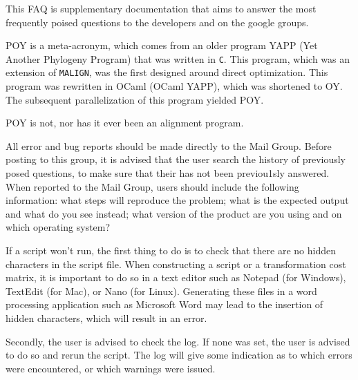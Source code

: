 This FAQ is supplementary documentation that aims to answer the most frequently poised questions to 
the \poy developers and on the \poy google groups.

\renewcommand{\cftdotsep}{\cftnodots} %
\listofquestions
\newpage


{POY is a meta-acronym, which comes from an older program YAPP (Yet Another Phylogeny Program) that
was written in \texttt{C}.  This program, which was an extension of \texttt{MALIGN}, was the first designed around direct
optimization.  This program was rewritten in OCaml (OCaml YAPP), which was shortened to OY.
The subsequent parallelization of this program yielded POY.}

{POY is not, nor has it ever been an alignment program.}

{All error and bug reports should be made directly to the \poy Mail Group. Before posting to this group, it is advised that the 
user search the history of previously posed questions, to make sure that their has not been previou1sly answered.
When reported to the Mail Group, users should include the following information: what steps will 
reproduce the problem; what is the expected output and what do you see instead;  what version of 
the product are you using and on which operating system?}

{If a script won't run, the first thing to do is to check that there are no hidden characters in the script file.
When constructing a script or a transformation cost matrix, it is important to do so in a text editor 
such as Notepad (for Windows), TextEdit (for Mac), or Nano (for Linux). Generating these files in 
a word processing application such as Microsoft Word may lead to the insertion of hidden 
characters, which will result in an error.

Secondly, the user is advised to check the log.  If none was set, the user is advised to do so and rerun the script.
The log will give some indication as to which errors were encountered, or which warnings were issued.}

